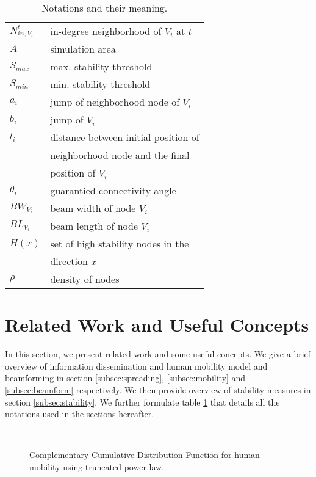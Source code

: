 \documentclass[preprint, twocolumn,5p]{elsarticle}
\begin{document}
\begin{table}[!htb]
\begin{tabular}{|l|l|}
        $N_{in,V_{i}}^{t}$ & in-degree neighborhood of $V_{i}$ at $t$\\
        $A$ & simulation area\\
        $S_{max}$ & max. stability threshold\\
        $S_{min}$ & min. stability threshold\\
        $a_{i}$ & jump of neighborhood node of $V_{i}$\\
        $b_{i}$ & jump of $V_{i}$\\
        $l_{i}$ & distance between initial position of\\
                & neighborhood node and the final \\
                & position of $V_{i}$\\
        $\theta_{i}$ & guarantied connectivity angle \\
        $BW_{V_{i}}$ & beam width of node $V_{i}$\\
        $BL_{V_{i}}$ & beam length of node $V_{i}$\\
        $H(x)$& set of high stability nodes in the \\
                     &direction $x$\\
        $\rho$ & density of nodes\\
        \hline
    \end{tabular}
    \caption{Notations and their meaning.}
    \label{table:N_M}
\end{table}


\section{Related Work and Useful Concepts}\label{sec:relatedwork}
    In this section, we present related work and some useful concepts. We give a brief overview of information dissemination and human mobility model and beamforming in section \ref{subsec:spreading}, \ref{subsec:mobility} and \ref{subsec:beamform} respectively. We then provide overview of stability measures in section \ref{subsec:stability}. We further formulate table \ref{table:N_M} that details all the notations used in the sections hereafter.

    \begin{figure*}
        \centering
        \mbox
        {
        }
        \caption{Complementary Cumulative Distribution Function for human mobility using truncated power law.}
        \label{fig:pdf_human_mobility}
    \end{figure*}
\end{document}
